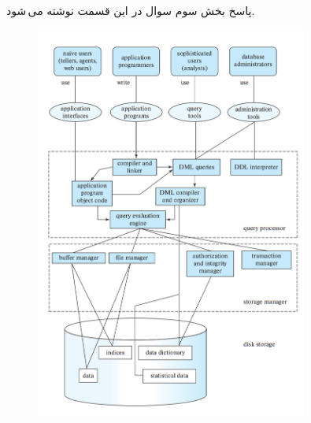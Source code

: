 \documentclass{article}
\begin{document}
\subsection{}
پاسخ بخش سوم سوال در این قسمت نوشته می\,شود.
\begin{figure}[ht]
    \centering
    \includegraphics[width=0.8\textwidth]{figures/1.3.png}
    \caption{}
    \label{fig:fig1}
\end{figure}
\FloatBarrier
\end{document}
